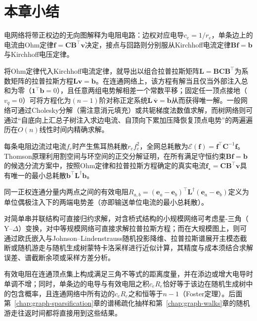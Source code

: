 \section{本章小结}
\label{sec:electrical-networks-summary}

电网络将带正权边的无向图解释为电阻电路：边权对应电导$c_e = 1/r_e$，单条边上的电流由Ohm定律$\bm f = \bm C\bm B^\top\bm v$决定，接点与回路则分别服从Kirchhoff电流定律$\bm B\bm f = \bm b$与Kirchhoff电压定律。

将Ohm定律代入Kirchhoff电流定律，就导出以组合拉普拉斯矩阵$\bm L = \bm B\bm C\bm B^\top$为系数矩阵的拉普拉斯方程$\bm L\bm v = \bm b$。在连通网络上，该方程有解当且仅当外部注入总和为零（$\bm 1^\top\bm b = 0$），且任意两组电势解相差一个常数平移；固定任一顶点接地（$v_q = 0$）可将方程化为$(n-1)$阶对称正定系统$\overline{\bm L}\,\overline{\bm v} = \overline{\bm b}$从而获得唯一解。一般网络可通过Cholesky分解（需注意消元填充）或共轭梯度法数值求解，而树网络则可通过“自底向上汇总子树注入求边电流、自顶向下累加压降恢复顶点电势”的两遍遍历在$O(n)$线性时间内精确求解。

每条电阻边流过电流$f_e$时产生焦耳热耗散$r_e f_e^2$，全网总耗散为$\mathcal E(\bm f) = \bm f^\top\bm C^{-1}\bm f$。Thomson原理利用割空间与环空间的正交分解证明，在所有满足守恒约束$\bm B\bm f = \bm b$的候选分流方案中，按照Ohm定律和拉普拉斯方程确定的真实电流$\bm f_\star = \bm C\bm B^\top\bm v$具有唯一的最小总耗散$\bm b^\top\bm L^\dagger\bm b$。

同一正权连通分量内两点之间的有效电阻$R_{a,b} = (\bm e_a - \bm e_b)^\top\bm L^\dagger(\bm e_a - \bm e_b)$定义为单位偶极注入下的两端电势差（亦即输送单位电流的最小总耗散）。

对简单串并联结构可直接归约求解，对含桥式结构的小规模网络可考虑星-三角（$\text{Y--}\Delta$）变换，对中等规模网络可直接求解拉普拉斯方程；而在大规模图上，则可通过欧氏嵌入与Johnson--Lindenstrauss随机投影降维、拉普拉斯谱展开主模态截断或随机游走与随机生成树蒙特卡洛采样进行近似计算，其精度与成本须结合求解误差、谱截断余项或采样方差分析。

有效电阻在连通顶点集上构成满足三角不等式的距离度量，并在添边或增大电导时单调不增；同时，单条边的电导与有效电阻之积$c_e R_e$恰好等于该边在随机生成树中的包含概率，且连通网络中所有边的$c_e R_e$之和恒等于$n-1$（Foster定理）。后面第~\ref{chap:graph-sparsification}章的谱稀疏化抽样和第~\ref{chap:graph-walks}章的随机游走往返时间都将直接用到这些结果。
